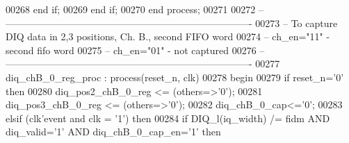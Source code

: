 \begin{DoxyCode}
00268             \textcolor{keywordflow}{end} \textcolor{keywordflow}{if}; 
00269         \textcolor{keywordflow}{end} \textcolor{keywordflow}{if};
00270     \textcolor{keywordflow}{end} \textcolor{keywordflow}{process};
00271 
00272 \textcolor{keyword}{-- ----------------------------------------------------------------------------}
00273 \textcolor{keyword}{-- To capture DIQ data in 2,3 positions, Ch. B., second FIFO word}
00274 \textcolor{keyword}{-- ch\_en="11" - second fifo word}
00275 \textcolor{keyword}{-- ch\_en="01" - not captured}
00276 \textcolor{keyword}{-- ----------------------------------------------------------------------------}
00277  diq\_chB\_0\_reg\_proc : \textcolor{keywordflow}{process}(reset_n, clk)
00278 \textcolor{vhdlkeyword}{    begin}
00279       \textcolor{keywordflow}{if} \textcolor{vhdlchar}{reset_n}\textcolor{vhdlchar}{=}\textcolor{vhdlchar}{'}\textcolor{vhdllogic}{}\textcolor{vhdllogic}{0}\textcolor{vhdlchar}{'} \textcolor{keywordflow}{then}
00280          \textcolor{vhdlchar}{diq_pos2_chB_0_reg} \textcolor{vhdlchar}{<=} \textcolor{vhdlchar}{(}\textcolor{keywordflow}{others}\textcolor{vhdlchar}{=}\textcolor{vhdlchar}{>}\textcolor{vhdlchar}{'}\textcolor{vhdllogic}{}\textcolor{vhdllogic}{0}\textcolor{vhdlchar}{'}\textcolor{vhdlchar}{)};
00281          \textcolor{vhdlchar}{diq_pos3_chB_0_reg} \textcolor{vhdlchar}{<=} \textcolor{vhdlchar}{(}\textcolor{keywordflow}{others}\textcolor{vhdlchar}{=}\textcolor{vhdlchar}{>}\textcolor{vhdlchar}{'}\textcolor{vhdllogic}{}\textcolor{vhdllogic}{0}\textcolor{vhdlchar}{'}\textcolor{vhdlchar}{)};
00282          \textcolor{vhdlchar}{diq_chB_0_cap}\textcolor{vhdlchar}{<=}\textcolor{vhdlchar}{'}\textcolor{vhdllogic}{}\textcolor{vhdllogic}{0}\textcolor{vhdlchar}{'};
00283       \textcolor{keywordflow}{elsif} \textcolor{vhdlchar}{(}\textcolor{vhdlchar}{clk}\textcolor{vhdlchar}{'}\textcolor{vhdlkeyword}{event} \textcolor{keywordflow}{and} \textcolor{vhdlchar}{clk} \textcolor{vhdlchar}{=} \textcolor{vhdlchar}{'}\textcolor{vhdllogic}{}\textcolor{vhdllogic}{1}\textcolor{vhdlchar}{'}\textcolor{vhdlchar}{)} \textcolor{keywordflow}{then}
00284             \textcolor{keywordflow}{if} \textcolor{vhdlchar}{DIQ_l}\textcolor{vhdlchar}{(}\textcolor{vhdlchar}{iq_width}\textcolor{vhdlchar}{)} \textcolor{vhdlchar}{/=} \textcolor{vhdlchar}{fidm} \textcolor{keywordflow}{AND} \textcolor{vhdlchar}{diq_valid}\textcolor{vhdlchar}{=}\textcolor{vhdlchar}{'}\textcolor{vhdllogic}{}\textcolor{vhdllogic}{1}\textcolor{vhdlchar}{'} \textcolor{keywordflow}{AND} \textcolor{vhdlchar}{diq_chB_0_cap_en}\textcolor{vhdlchar}{=}\textcolor{vhdlchar}{'}\textcolor{vhdllogic}{}\textcolor{vhdllogic}{1}\textcolor{vhdlchar}{'} \textcolor{keywordflow}{then} 

\end{DoxyCode}
